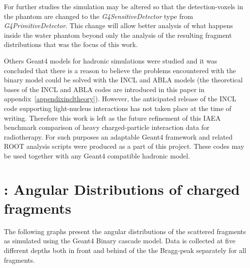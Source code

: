 For further studies the simulation may be altered so that the detection-voxels in the phantom are changed to the \textit{G4SensitiveDetector} type from \textit{G4PrimitiveDetector}. This change will allow better analysis of what happens inside the water phantom beyond only the analysis of the resulting fragment distributions that was the focus of this work.

Others Geant4 models for hadronic simulations were studied and it was concluded that there is a reason to believe the problems encountered with the binary model could be solved with the INCL and ABLA models (the theoretical bases of the INCL and ABLA codes are introduced in this paper in appendix~\ref{appendixincltheory}). However, the anticipated release of the INCL code supporting light-nucleus interactions has not taken place at the time of writing. Therefore this work is left as the future refinement of this IAEA benchmark comparison of heavy charged-particle interaction data for radiotherapy. For such purposes an adaptable Geant4 framework and related ROOT analysis scripts were produced as a part of this project. These codes may be used together with any Geant4 compatible hadronic model.

\clearpage

  

\appendix 

\clearpage
{}
\section{\label{AppendixA}: Angular Distributions of charged fragments\label{AngularDistributionAppendix}}

The following graphs present the angular distributions of the scattered fragments as simulated using the Geant4 Binary cascade model. Data is collected at five different depths both in front and behind of the the Bragg-peak separately for all fragments.

\renewcommand{\theequation}{A\arabic{equation}}
\setcounter{equation}{0}  
\renewcommand{\thefigure}{A\arabic{figure}}
\setcounter{figure}{0}
\renewcommand{\thetable}{A\arabic{table}}
\setcounter{table}{0}
\renewcommand\thesection{A}
\setcounter{section}{1}

